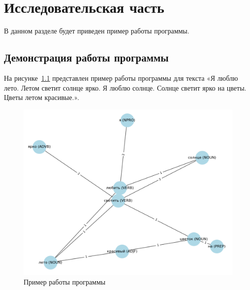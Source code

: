 \chapter{Исследовательская часть}

В данном разделе будет приведен пример работы программы.

\section{Демонстрация работы программы}

На рисунке~\ref{fig:example} представлен пример работы программы для текста «Я люблю лето. Летом светит солнце ярко. Я люблю солнце. Солнце светит ярко на цветы. Цветы летом красивые.».

\begin{figure}[h!]
	\centering
	\includegraphics[width=\linewidth]{img/example}
	\caption{Пример работы программы}
	\label{fig:example}
\end{figure}
